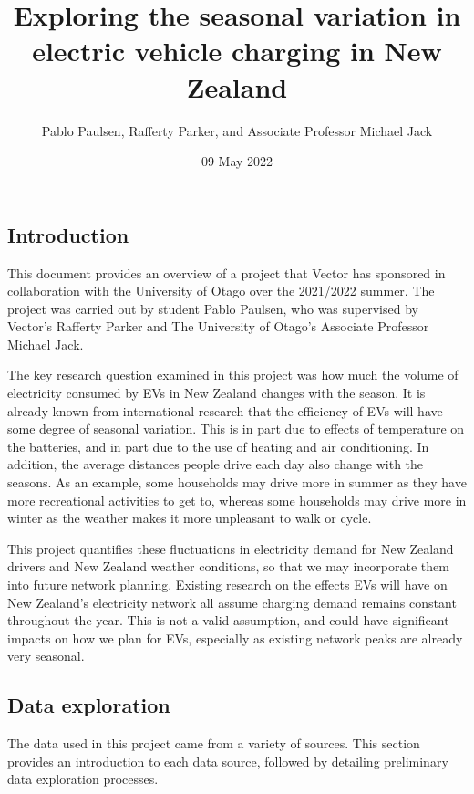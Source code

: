 \documentclass[
]{article}
\title{Exploring the seasonal variation in electric vehicle charging in
New Zealand}
\author{Pablo Paulsen, Rafferty Parker, and Associate Professor Michael
Jack}
\date{09 May 2022}
\begin{document}
\maketitle

\hypertarget{introduction}{%
\subsection{Introduction}\label{introduction}}

This document provides an overview of a project that Vector has
sponsored in collaboration with the University of Otago over the
2021/2022 summer. The project was carried out by student Pablo Paulsen,
who was supervised by Vector's Rafferty Parker and The University of
Otago's Associate Professor Michael Jack.

The key research question examined in this project was how much the
volume of electricity consumed by EVs in New Zealand changes with the
season. It is already known from international research that the
efficiency of EVs will have some degree of seasonal variation. This is
in part due to effects of temperature on the batteries, and in part due
to the use of heating and air conditioning. In addition, the average
distances people drive each day also change with the seasons. As an
example, some households may drive more in summer as they have more
recreational activities to get to, whereas some households may drive
more in winter as the weather makes it more unpleasant to walk or cycle.

This project quantifies these fluctuations in electricity demand for New
Zealand drivers and New Zealand weather conditions, so that we may
incorporate them into future network planning. Existing research on the
effects EVs will have on New Zealand's electricity network all assume
charging demand remains constant throughout the year. This is not a
valid assumption, and could have significant impacts on how we plan for
EVs, especially as existing network peaks are already very seasonal.

\hypertarget{data-exploration}{%
\subsection{Data exploration}\label{data-exploration}}

The data used in this project came from a variety of sources. This
section provides an introduction to each data source, followed by
detailing preliminary data exploration processes.
\end{document}
